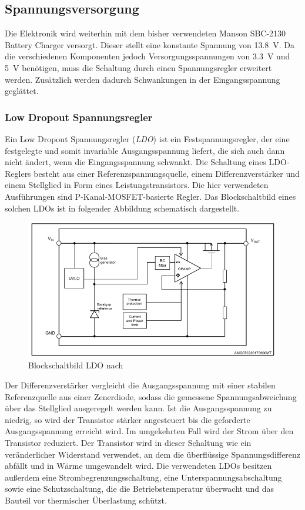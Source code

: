 \subsection{Spannungsversorgung}\label{sec:spannver}
Die Elektronik wird weiterhin mit dem bisher verwendeten Manson SBC-2130 Battery Charger versorgt. Dieser stellt eine konstante Spannung von \SI{13,8}{V}. Da die verschiedenen Komponenten jedoch Versorgungsspannungen von \SI{3,3}{V} und \SI{5}{V} benötigen, muss die Schaltung durch einen Spannungsregler erweitert werden. Zusätzlich werden dadurch Schwankungen in der Eingangsspannung geglättet. 
\subsubsection{Low Dropout Spannungsregler}
Ein Low Dropout Spannungsregler (\textit{LDO}) ist ein Festspannungsregler, der eine festgelegte und somit invariable Ausgangsspannung liefert, die sich auch dann nicht ändert, wenn die Eingangsspannung schwankt. Die Schaltung eines LDO-Reglers besteht aus einer Referenzspannungsquelle, einem Differenzverstärker und einem Stellglied in Form eines Leistungstransistors. Die hier verwendeten Ausführungen sind P-Kanal-MOSFET-basierte Regler. Das Blockschaltbild eines solchen LDOs ist in folgender Abbildung schematisch dargestellt.\\
\begin{figure}[H]
	\centering
		\includegraphics[width=350pt]{./Bilder/LDO.png}
	\caption{Blockschaltbild LDO nach \cite{ldo}}
	\label{fig:LDO2}
\end{figure} \noindent
Der Differenzverstärker vergleicht die Ausgangsspannung mit einer stabilen Referenzquelle aus einer Zenerdiode, sodass die gemessene Spannungsabweichung über das Stellglied ausgeregelt werden kann. Ist die Ausgangsspannung zu niedrig, so wird der Transistor stärker angesteuert bis die geforderte Ausgangsspannung erreicht wird. Im umgekehrten Fall wird der Strom über den Transistor reduziert. Der Transistor wird in dieser Schaltung wie ein veränderlicher Widerstand verwendet, an dem die überflüssige Spannungsdifferenz abfällt und in Wärme umgewandelt wird. Die verwendeten LDOs besitzen außerdem eine Strombegrenzungsschaltung, eine Unterspannungsabschaltung sowie eine Schutzschaltung, die die Betriebstemperatur überwacht und das Bauteil vor thermischer Überlastung schützt. 
